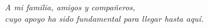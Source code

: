 
\clearpage
\thispagestyle{empty}
\mbox{} 
\clearpage

\thispagestyle{empty}
\vspace*{5cm} 

\begin{flushright}
	\small\em{
		A mi familia, amigos y compañeros,\\
        cuyo apoyo ha sido fundamental para llegar hasta aquí.}
\end{flushright}

\clearpage



